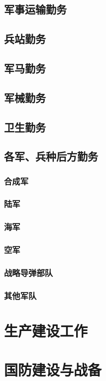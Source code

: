 \documentclass[UTF8]{../ApplicationUniverse}
\begin{document}
    \subsection{军事运输勤务}
    \subsection{兵站勤务}
    \subsection{军马勤务}
    \subsection{军械勤务}
    \subsection{卫生勤务}
    \subsection{各军、兵种后方勤务}
        \subsubsection{合成军}
        \subsubsection{陆军}
        \subsubsection{海军}
        \subsubsection{空军}
        \subsubsection{战略导弹部队}
        \subsubsection{其他军队}
\section{生产建设工作}
\section{国防建设与战备}
\end{document}

